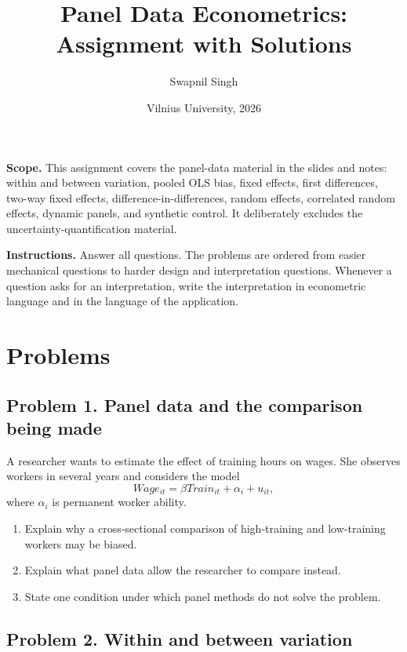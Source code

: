 \documentclass[11pt]{article}
\title{Panel Data Econometrics: Assignment with Solutions}
\author{Swapnil Singh}
\date{Vilnius University, 2026}
\begin{document}
\maketitle

\begin{assignmentbox}
\textbf{Scope.} This assignment covers the panel-data material in the slides and notes: within and between variation, pooled OLS bias, fixed effects, first differences, two-way fixed effects, difference-in-differences, random effects, correlated random effects, dynamic panels, and synthetic control. It deliberately excludes the uncertainty-quantification material.
\end{assignmentbox}

\begin{assignmentbox}
\textbf{Instructions.} Answer all questions. The problems are ordered from easier mechanical questions to harder design and interpretation questions. Whenever a question asks for an interpretation, write the interpretation in econometric language and in the language of the application.
\end{assignmentbox}

\section*{Problems}

\subsection*{Problem 1. Panel data and the comparison being made}

A researcher wants to estimate the effect of training hours on wages. She observes workers in several years and considers the model
\[
Wage_{it}=\beta Train_{it}+\alpha_i+u_{it},
\]
where $\alpha_i$ is permanent worker ability.

\begin{enumerate}[label=(\alph*)]
\item Explain why a cross-sectional comparison of high-training and low-training workers may be biased.
\item Explain what panel data allow the researcher to compare instead.
\item State one condition under which panel methods do not solve the problem.
\end{enumerate}

\subsection*{Problem 2. Within and between variation}
\end{document}
